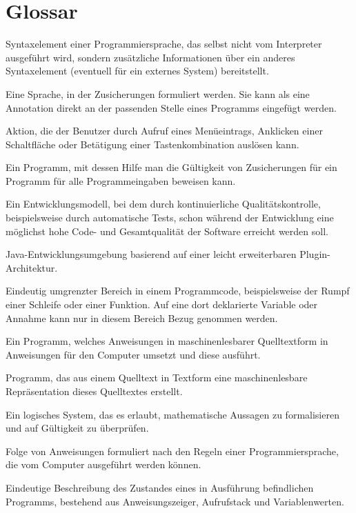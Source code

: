 \section{Glossar}
\newcommand{\glossaritem}[1]{\item[#1]}


\begin{description}
    \label{Zusicherung}
    \glossaritem{Annotation} Syntaxelement einer Programmiersprache, das selbst nicht vom Interpreter ausgeführt wird, sondern zusätzliche Informationen über ein anderes Syntaxelement (eventuell für ein externes System) bereitstellt.
    \glossaritem{Annotationssprache (Beweiser)} Eine Sprache, in der Zusicherungen formuliert werden. Sie kann als eine Annotation direkt an der passenden Stelle eines Programms eingefügt werden.
    \glossaritem{Befehl~(GUI)} Aktion, die der Benutzer durch Aufruf eines Menüeintrags, Anklicken einer Schaltfläche oder Betätigung einer Tastenkombination auslösen kann.
    \glossaritem{Beweiser} Ein Programm, mit dessen Hilfe man die Gültigkeit von Zusicherungen für ein Programm für alle Programmeingaben beweisen kann.
    \glossaritem{Continous Integration} Ein Entwicklungsmodell, bei dem durch kontinuierliche Qualitätskontrolle, beispielsweise durch automatische Tests, schon während der Entwicklung eine möglichst hohe Code- und Gesamtqualität der Software erreicht werden soll.
    \glossaritem{Eclipse} Java-Entwicklungsumgebung basierend auf einer leicht erweiterbaren Plugin-Architektur.
    \glossaritem{Gültigkeitsbereich} Eindeutig umgrenzter Bereich in einem Programmcode, beispielsweise der Rumpf einer Schleife oder einer Funktion. Auf eine dort deklarierte Variable oder Annahme kann nur in diesem Bereich Bezug genommen werden.
    \glossaritem{Interpreter} Ein Programm, welches Anweisungen in maschinenlesbarer Quelltextform in Anweisungen für den Computer umsetzt und diese ausführt.
    \glossaritem{Parser} Programm, das aus einem Quelltext in Textform eine maschinenlesbare Repräsentation dieses Quelltextes erstellt.
    \glossaritem{Prädikatenlogik} Ein logisches System, das es erlaubt, mathematische Aussagen zu formalisieren und auf Gültigkeit zu überprüfen. %
    \glossaritem{Programm} Folge von Anweisungen formuliert nach den Regeln einer Programmiersprache, die vom Computer ausgeführt werden können.
    \glossaritem{Programmzustand} Eindeutige Beschreibung des Zustandes eines in Ausführung befindlichen Programms, bestehend aus Anweisungszeiger, Aufrufstack und Variablenwerten.

\end{description}
